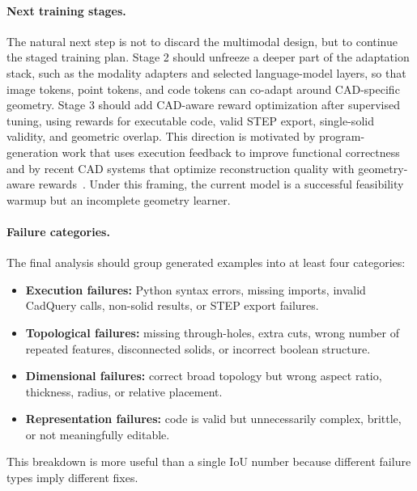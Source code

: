 \documentclass{article}
\begin{document}
\paragraph{Next training stages.}
The natural next step is not to discard the multimodal design, but to continue the staged training plan. Stage 2 should unfreeze a deeper part of the adaptation stack, such as the modality adapters and selected language-model layers, so that image tokens, point tokens, and code tokens can co-adapt around CAD-specific geometry. Stage 3 should add CAD-aware reward optimization after supervised tuning, using rewards for executable code, valid STEP export, single-solid validity, and geometric overlap. This direction is motivated by program-generation work that uses execution feedback to improve functional correctness~\cite{le2022coderl} and by recent CAD systems that optimize reconstruction quality with geometry-aware rewards~\cite{kolodiazhnyi2025cadrille,elistratov2026cadevolve}. Under this framing, the current model is a successful feasibility warmup but an incomplete geometry learner.

\paragraph{Failure categories.}
The final analysis should group generated examples into at least four categories:
\begin{itemize}
  \item \textbf{Execution failures:} Python syntax errors, missing imports, invalid CadQuery calls, non-solid results, or STEP export failures.
  \item \textbf{Topological failures:} missing through-holes, extra cuts, wrong number of repeated features, disconnected solids, or incorrect boolean structure.
  \item \textbf{Dimensional failures:} correct broad topology but wrong aspect ratio, thickness, radius, or relative placement.
  \item \textbf{Representation failures:} code is valid but unnecessarily complex, brittle, or not meaningfully editable.
\end{itemize}
This breakdown is more useful than a single IoU number because different failure types imply different fixes.
\end{document}
